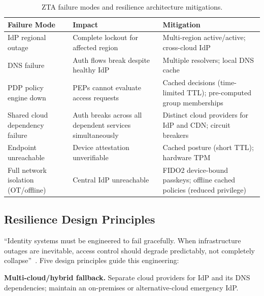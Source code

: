\documentclass[sigconf,nonacm]{acmart}
\begin{document}
\begin{table}[t]
\caption{ZTA failure modes and resilience architecture mitigations.}
\label{tab:failures}
\small
\setlength{\tabcolsep}{5pt}
\begin{tabularx}{\textwidth}{@{}
  p{3.5cm}   %
  p{4.5cm}   %
  X          %
@{}}
\toprule
\textbf{Failure Mode} & \textbf{Impact} & \textbf{Mitigation} \\
\midrule
IdP regional outage
  & Complete lockout for affected region
  & Multi-region active/active; cross-cloud IdP~\cite{hackernews2024} \\
\addlinespace[3pt]
DNS failure
  & Auth flows break despite healthy IdP
  & Multiple resolvers; local DNS cache \\
\addlinespace[3pt]
PDP policy engine down
  & PEPs cannot evaluate access requests
  & Cached decisions (time-limited TTL); pre-computed group memberships \\
\addlinespace[3pt]
Shared cloud dependency failure
  & Auth breaks across all dependent services simultaneously
  & Distinct cloud providers for IdP and CDN; circuit breakers~\cite{hackernews2024} \\
\addlinespace[3pt]
Endpoint unreachable
  & Device attestation unverifiable
  & Cached posture (short TTL); hardware TPM \\
\addlinespace[3pt]
Full network isolation (OT/offline)
  & Central IdP unreachable
  & FIDO2 device-bound passkeys; offline cached policies (reduced privilege) \\
\bottomrule
\end{tabularx}
\end{table}

\subsection{Resilience Design Principles}

``Identity systems must be engineered to fail gracefully. When
infrastructure outages are inevitable, access control should degrade
predictably, not completely collapse''~\cite{hackernews2024}.  Five
design principles guide this engineering:

\textbf{Multi-cloud/hybrid fallback.}  Separate cloud providers for
IdP and its DNS dependencies; maintain an on-premises or
alternative-cloud emergency IdP.
\end{document}
